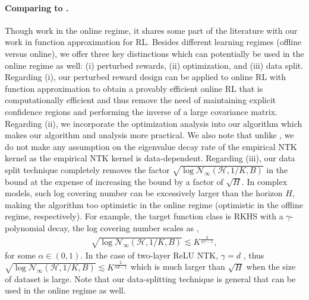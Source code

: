 \documentclass{article} \usepackage{iclr2023/iclr2023_conference,times}
\begin{document}
\paragraph{Comparing to \cite{yang2020function}.} Though \citet{yang2020function} work in the online regime, it shares some part of the literature with our work in function approximation for RL. Besides different learning regimes (offline versus online), we offer three key distinctions which can potentially be used in the online regime as well: (i) perturbed rewards, (ii) optimization, and (iii) data split. Regarding (i), our perturbed reward design can be applied to online RL with function approximation to obtain a provably efficient online RL that is computationally efficient and thus remove the need of maintaining explicit confidence regions and performing the inverse of a large covariance matrix. Regarding (ii), we incorporate the optimization analysis into our algorithm which makes our algorithm and analysis more practical. We also note that unlike \citep{yang2020function}, we do not make any assumption on the eigenvalue decay rate of the empirical NTK kernel as the empirical NTK kernel is data-dependent. Regarding (iii), our data split technique completely removes the factor $\sqrt{ \log \mathcal{N}_{\infty}(\mathcal{H}, 1/K, B)}$ in the bound at the expense of increasing the bound by a factor of $\sqrt{H}$. In complex models, such log covering number can be excessively larger than the horizon $H$, making the algorithm too optimistic in the online regime (optimistic in the offline regime, respectively). For example, the target function class is RKHS with a $\gamma$-polynomial decay, the log covering number scales as \citep[Lemma~D1]{yang2020function},
\begin{align*}
    \sqrt{\log \mathcal{N}_{\infty}(\mathcal{H}, 1/K, B)} \lesssim  K ^{\frac{2}{\alpha \gamma -1}},
\end{align*}
for some $\alpha \in (0,1)$. In the case of two-layer ReLU NTK, $\gamma = d$ \citep{bietti2019inductive}, thus $\sqrt{\log \mathcal{N}_{\infty}(\mathcal{H}, 1/K, B)} \lesssim  K ^{\frac{2}{\alpha d -1}}$ which is much larger than $\sqrt{H}$ when the size of dataset is large. Note that our data-splitting technique is general that can be used in the online regime as well. 
\end{document}
